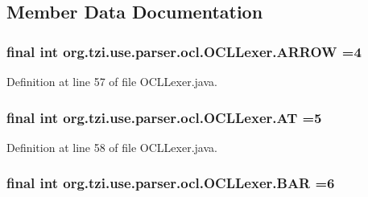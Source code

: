 \subsection{Member Data Documentation}
\hypertarget{classorg_1_1tzi_1_1use_1_1parser_1_1ocl_1_1_o_c_l_lexer_aae7d496ebe400ad739303c3908a4b410}{
\subsubsection[{A\-R\-R\-O\-W}]{\setlength{\rightskip}{0pt plus 5cm}final int org.\-tzi.\-use.\-parser.\-ocl.\-O\-C\-L\-Lexer.\-A\-R\-R\-O\-W =4\hspace{0.3cm}{\ttfamily [static]}}}\label{classorg_1_1tzi_1_1use_1_1parser_1_1ocl_1_1_o_c_l_lexer_aae7d496ebe400ad739303c3908a4b410}


Definition at line 57 of file O\-C\-L\-Lexer.\-java.

\hypertarget{classorg_1_1tzi_1_1use_1_1parser_1_1ocl_1_1_o_c_l_lexer_aad997e71225ea6e592fa504e31825480}{
\subsubsection[{A\-T}]{\setlength{\rightskip}{0pt plus 5cm}final int org.\-tzi.\-use.\-parser.\-ocl.\-O\-C\-L\-Lexer.\-A\-T =5\hspace{0.3cm}{\ttfamily [static]}}}\label{classorg_1_1tzi_1_1use_1_1parser_1_1ocl_1_1_o_c_l_lexer_aad997e71225ea6e592fa504e31825480}


Definition at line 58 of file O\-C\-L\-Lexer.\-java.

\hypertarget{classorg_1_1tzi_1_1use_1_1parser_1_1ocl_1_1_o_c_l_lexer_a39ab2a85441ca80ab630d3456d1d137e}{
\subsubsection[{B\-A\-R}]{\setlength{\rightskip}{0pt plus 5cm}final int org.\-tzi.\-use.\-parser.\-ocl.\-O\-C\-L\-Lexer.\-B\-A\-R =6\hspace{0.3cm}{\ttfamily [static]}}}\label{classorg_1_1tzi_1_1use_1_1parser_1_1ocl_1_1_o_c_l_lexer_a39ab2a85441ca80ab630d3456d1d137e}


